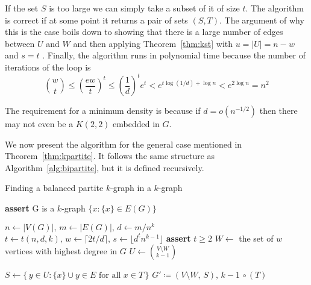 If the set $S$ is too large we can simply take a subset of it of size $t$.
The algorithm is correct if at some point it returns a pair of sets $(S, T)$.
The argument of why this is the case boils down to showing that there is a
large number of edges between $U$ and $W$ and then applying Theorem~\ref{thm:kst}
with $u = |U| = n - w$ and $s = t$ .
Finally, the algorithm runs in polynomial time because 
the  number of iterations of the loop is
\[
    \binom{w}{t} \leq
    \left(\frac{ew}{t}\right)^t \leq
    \left(\frac{1}{d}\right)^t e^t < e^{t \log (1/d) + \log n} <
    e^{2\log n} = n^2
\]

\begin{remark}
    The requirement for a minimum density is because if $d = o\left(n^{-1/2}\right)$ then
    there may not even be a $K(2, 2)$ embedded in $G$. %
\end{remark}

We now present the algorithm for the general case mentioned in Theorem~\ref{thm:kpartite}.
It follows the same structure as Algorithm~\ref{alg:bipartite},
but it is defined recursively.

\begin{algorithm}
    \caption{Finding a balanced partite $k$-graph in a $k$-graph}
    \label{alg:kpartite}
    \begin{algorithmic}[1]
            \State \textbf{assert} G is a $k$-graph
                \State \Return $\{x : \{x\} \in E(G)\}$
            \EndIf

            \State $n \gets |V(G)|,\, m \gets |E(G)|,\, d \gets m/n^k$
            \State $t \gets t(n, d, k),\, w \gets \lceil 2t/d \rceil,\, s \gets \lfloor d^t n^{k-1} \rfloor$ \label{line:tws}
            \State \textbf{assert} $t \geq 2$ \label{line:min_t}
            \State $W \gets$ the set of $w$ vertices with highest degree in $G$ \label{line:W}
            \State $U \gets \binom{V\setminus W}{k-1}$

             \label{line:for}
                \State $S \gets \{\,y \in U : \{x\} \cup y \in E \text{ for all } x \in T\,\}$
                    \State \Return {}
                    {$G' \coloneqq (V \setminus W,\, S),\, k-1$} $\circ \, (T)$\label{line:return}
                \EndIf
            \EndFor
        \EndFunction
    \end{algorithmic}
\end{algorithm}

